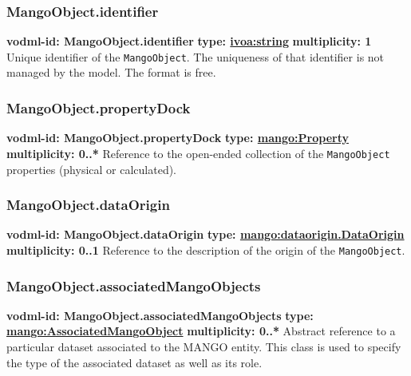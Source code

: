     \subsubsection{MangoObject.identifier}
      \textbf{vodml-id: MangoObject.identifier} \newline
      \textbf{type: \hyperref[sect:ivoa]{ivoa:string}} \newline
      \textbf{multiplicity: 1} \newline 
      Unique identifier of the \texttt{MangoObject}. The uniqueness of that identifier is not managed by the model. The format is free.

    \subsubsection{MangoObject.propertyDock}
      \textbf{vodml-id: MangoObject.propertyDock} \newline
      \textbf{type: \hyperref[sect:Property]{mango:Property}} \newline
      \textbf{multiplicity: 0..*} \newline 
      Reference to the open-ended collection of the \texttt{MangoObject} properties (physical or calculated).

    \subsubsection{MangoObject.dataOrigin}
      \textbf{vodml-id: MangoObject.dataOrigin} \newline
      \textbf{type: \hyperref[sect:dataorigin.DataOrigin]{mango:dataorigin.DataOrigin}} \newline
      \textbf{multiplicity: 0..1} \newline 
      Reference to the description of the origin of the \texttt{MangoObject}.

    \subsubsection{MangoObject.associatedMangoObjects}
      \textbf{vodml-id: MangoObject.associatedMangoObjects} \newline
      \textbf{type: \hyperref[sect:AssociatedMangoObject]{mango:AssociatedMangoObject}} \newline
      \textbf{multiplicity: 0..*} \newline 
      Abstract reference to a particular dataset associated to the MANGO entity. This class is used to specify the type of the associated dataset as well as its role.

